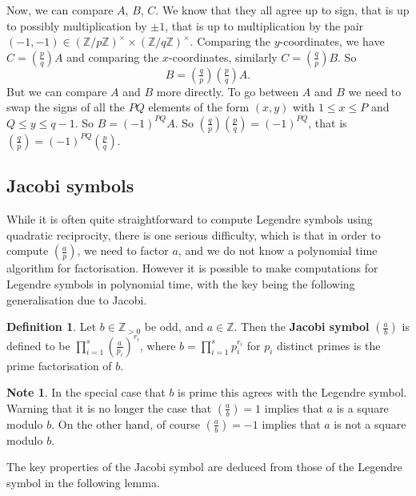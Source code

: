 \documentclass{article}
\newcommand{\Z}{\mathbb{Z}}
\newcommand{\rb}[1]{\left( #1 \right)}
\newcommand{\unit}[1]{\rb{\Z / #1\Z}^\times}
\newcommand{\legendre}[2]{\rb{\tfrac{#1}{#2}}}
\theoremstyle{definition}\newtheorem{definition}{Definition}
\theoremstyle{definition}\newtheorem{remark}[definition]{Remark}
\theoremstyle{definition}\newtheorem*{example}{Example}
\theoremstyle{definition}\newtheorem*{note}{Note}
\begin{document}
Now, we can compare $ A $, $ B $, $ C $. We know that they all agree up to sign, that is up to possibly multiplication by $ \pm 1 $, that is up to multiplication by the pair $ \rb{-1, -1} \in \unit{p} \times \unit{q} $. Comparing the $ y $-coordinates, we have $ C = \legendre{p}{q}A $ and comparing the $ x $-coordinates, similarly $ C = \legendre{q}{p}B $. So
$$ B = \legendre{q}{p}\legendre{p}{q}A. $$
But we can compare $ A $ and $ B $ more directly. To go between $ A $ and $ B $ we need to swap the signs of all the $ PQ $ elements of the form $ \rb{x, y} $ with $ 1 \le x \le P $ and $ Q \le y \le q - 1 $. So $ B = \rb{-1}^{PQ}A $. So $ \legendre{q}{p}\legendre{p}{q} = \rb{-1}^{PQ} $, that is $ \legendre{q}{p} = \rb{-1}^{PQ}\legendre{p}{q} $.

\subsection{Jacobi symbols}

While it is often quite straightforward to compute Legendre symbols using quadratic reciprocity, there is one serious difficulty, which is that in order to compute $ \legendre{a}{p} $, we need to factor $ a $, and we do not know a polynomial time algorithm for factorisation. However it is possible to make computations for Legendre symbols in polynomial time, with the key being the following generalisation due to Jacobi.

\begin{definition}
Let $ b \in \Z_{> 0} $ be odd, and $ a \in \Z $. Then the \textbf{Jacobi symbol} $ \legendre{a}{b} $ is defined to be $ \prod_{i = 1}^s \legendre{a}{p_i}^{r_i} $, where $ b = \prod_{i = 1}^s p_i^{r_i} $ for $ p_i $ distinct primes is the prime factorisation of $ b $.
\end{definition}

\begin{note}
In the special case that $ b $ is prime this agrees with the Legendre symbol. Warning that it is no longer the case that $ \legendre{a}{b} = 1 $ implies that $ a $ is a square modulo $ b $. On the other hand, of course $ \legendre{a}{b} = -1 $ implies that $ a $ is not a square modulo $ b $.
\end{note}


The key properties of the Jacobi symbol are deduced from those of the Legendre symbol in the following lemma.
\end{document}

